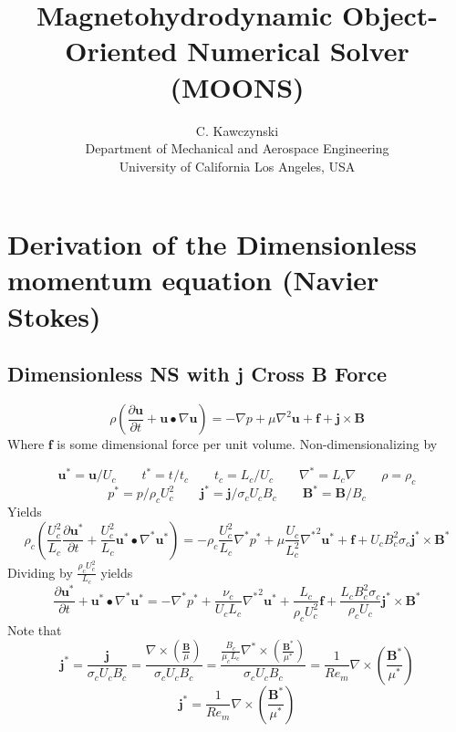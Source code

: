 \documentclass[11pt]{article}
\begin{document}
\doublespacing
\title{Magnetohydrodynamic Object-Oriented Numerical Solver (MOONS)}
\author{C. Kawczynski \\
Department of Mechanical and Aerospace Engineering \\
University of California Los Angeles, USA\\
}
\maketitle

\section{Derivation of the Dimensionless momentum equation (Navier Stokes)}
\subsection{Dimensionless NS with j Cross B Force}
\begin{equation}
	\rho \left( \frac{\partial \pmb{u}}{\partial t} + \pmb{u} \bullet \nabla \pmb{u} \right) = 
	-\nabla p + \mu \nabla^2 \pmb{u} + \pmb{f} + \pmb{j} \times \pmb{B}
\end{equation}
Where $\pmb{f}$ is some dimensional force per unit volume. Non-dimensionalizing by

\begin{equation}
	\pmb{u}^* = \pmb{u}/U_c \qquad
	t^* = t/t_c \qquad
	t_c = L_c/U_c \qquad
	\nabla^* = L_c \nabla \qquad
	\rho = \rho_c
\end{equation}
\begin{equation}
	p^* = p/\rho_c U_c^2 \qquad
	\pmb{j}^* = \pmb{j}/ \sigma_c U_c B_c \qquad
	\pmb{B}^* = \pmb{B}/B_c
\end{equation}
Yields
\begin{equation}
	\rho_c \left( \frac{U_c^2}{L_c} \frac{\partial \pmb{u^*}}{\partial t} + \frac{U_c^2}{L_c} \pmb{u^*} \bullet \nabla^* \pmb{u^*} \right) = 
	- \rho_c \frac{U_c^2}{L_c} \nabla^*  p^* + \mu \frac{U_c}{L_c^2} {\nabla^*}^2 \pmb{u^*} + \pmb{f} +
	U_c B_c^2 \sigma_c \pmb{j^*} \times \pmb{B^*}
\end{equation}
Dividing by $\frac{\rho_c U_c^2}{L_c}$ yields
\begin{equation}
	\frac{\partial \pmb{u^*}}{\partial t} + \pmb{u^*} \bullet \nabla^* \pmb{u^*} = 
	- \nabla^*  p^* + 
	\frac{\nu_c}{U_c L_c} {\nabla^*}^2 \pmb{u^*} + \frac{L_c}{\rho_c U_c^2} \pmb{f} + 
	\frac{L_c B_c^2 \sigma_c}{\rho_c U_c} \pmb{j^*} \times \pmb{B^*}
\end{equation}
Note that
\begin{equation}
	\pmb{j}^*
	=
	\frac{\pmb{j}}{\sigma_c U_c B_c}
	=
	\frac{\nabla \times \left( \frac{\pmb{B}}{\mu} \right)}{\sigma_c U_c B_c}
	=
	\frac{ \frac{B_c}{\mu_c L_c} \nabla^* \times \left( \frac{\pmb{B}^*}{\mu^*} \right)}{\sigma_c U_c B_c}
	=
	\frac{1}{Re_m} \nabla \times \left( \frac{\pmb{B}^*}{\mu^*} \right)
\end{equation}
\begin{equation}
	\boxed{
	\pmb{j}^*
	=
	\frac{1}{Re_m} \nabla \times \left( \frac{\pmb{B}^*}{\mu^*} \right)
	}
\end{equation}
\end{document}
